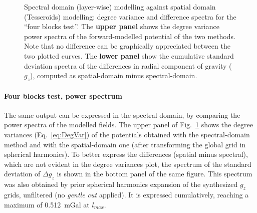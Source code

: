\begin{subappendices}
\begin{figure} %
    \begin{adjustbox}{center}
    \end{adjustbox}
    \caption[Spectral domain modelling against spatial domain modelling: degree variance and difference spectra (four blocks test).]{
        Spectral domain (layer-wise) modelling against spatial domain (Tesseroids) modelling: degree variance and difference spectra for the ``four blocks test''.
        The \textbf{upper panel} shows the degree variance power spectra of the forward-modelled potential of the two methods.
        Note that no difference can be graphically appreciated between the two plotted curves.
        The \textbf{lower panel} show the cumulative standard deviation spectra of the differences in radial component of gravity ($g_z$), computed as spatial-domain minus spectral-domain.}
    \label{fig:SpatSpecComp:4B_dv_spec_tess}
\end{figure}

\paragraph*{Four blocks test, power spectrum}
The same output can be expressed in the spectral domain, by comparing the power spectra of the modelled fields. The upper panel of Fig.~\ref{fig:SpatSpecComp:4B_dv_spec_tess} shows the degree variances (Eq.~\ref{eq:DegVar}) of the potentials obtained with the spectral-domain method and with the spatial-domain one (after transforming the global grid in spherical harmonics).
To better express the differences (spatial minus spectral), which are not evident in the degree variances plot, the spectrum of the standard deviation of $\Delta g_z$ is shown in the bottom panel of the same figure.
This spectrum was also obtained by prior spherical harmonics expansion of the synthesized $g_z$ grids, unfiltered (no \textit{gentle cut} applied).
It is expressed cumulatively, reaching a maximum of \SI{0.512}{\milli Gal} at $l_{max}$.


\end{subappendices}
